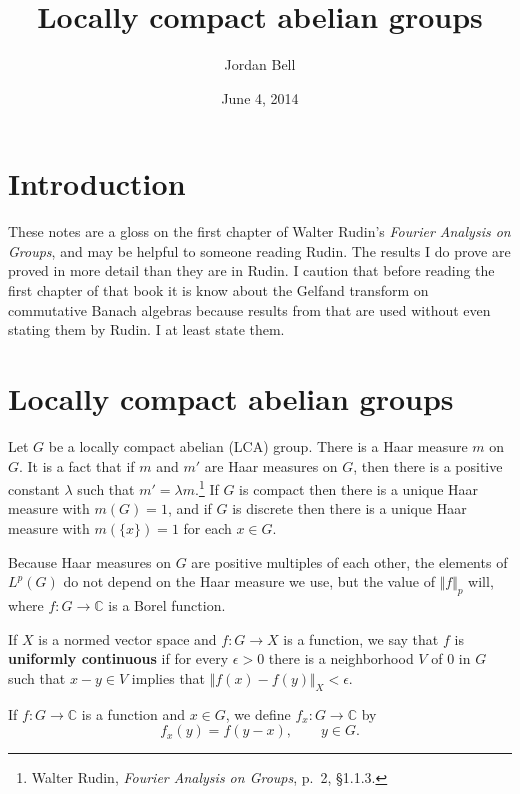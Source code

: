 \documentclass{article}
\newcommand{\norm}[1]{\Vert #1 \Vert}
\begin{document}
\title{Locally compact abelian groups}
\author{Jordan Bell}
\date{June 4, 2014}
\maketitle

\section{Introduction}
These notes are a gloss on the first chapter of Walter Rudin's {\em Fourier Analysis on Groups}, and 
may be helpful to someone reading Rudin. The results I do prove are proved in more detail than they are in Rudin.
I caution that before reading the first chapter of that book 
it is know about the Gelfand transform on commutative Banach algebras
 because results from that are used without even stating them by Rudin. I at least state them.

\section{Locally compact abelian groups}
Let $G$ be a locally compact abelian (LCA) group. There is a Haar measure $m$ on $G$. 
It is a fact that if $m$ and $m'$ are Haar measures on $G$, then there is a positive constant $\lambda$ such that 
$m'=\lambda m$.\footnote{Walter Rudin, {\em Fourier Analysis on Groups}, p.~2, \S 1.1.3.}
If $G$ is compact
then there is a unique Haar measure with $m(G)=1$, and if $G$ is discrete then there is a unique Haar measure
with $m(\{x\})=1$ for each $x \in G$.




Because Haar measures on $G$ are positive multiples of each other,
the elements of $L^p(G)$ do not depend on the Haar measure we use, but the value of
$\norm{f}_p$ will, where   $f:G \to \mathbb{C}$ is a  Borel function.

If $X$ is a normed vector space and $f:G \to X$ is a function, we say that $f$ is \textbf{uniformly continuous}
if for every $\epsilon>0$ there is a neighborhood $V$ of $0$ in $G$ such that $x-y \in V$ implies that
$\norm{f(x)-f(y)}_X < \epsilon$.

If $f:G \to \mathbb{C}$ is a function and $x \in G$, we define $f_x:G \to \mathbb{C}$ by 
\[
f_x(y)=f(y-x), \qquad y \in G.
\]
\end{document}

